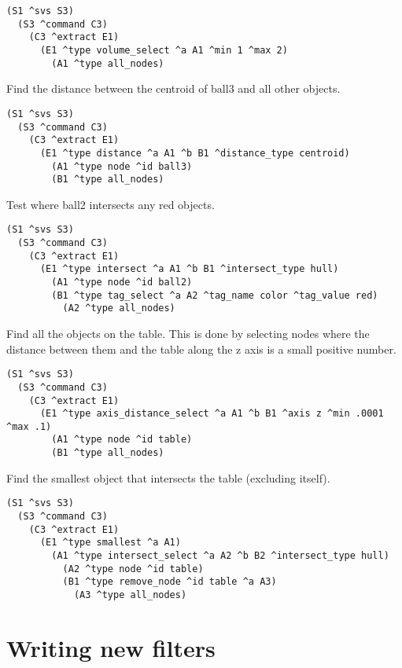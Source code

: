 \begin{verbatim}
(S1 ^svs S3)
  (S3 ^command C3)
    (C3 ^extract E1)
      (E1 ^type volume_select ^a A1 ^min 1 ^max 2)
        (A1 ^type all_nodes)
\end{verbatim} 

Find the distance between the centroid of ball3 and all other objects. 

\begin{verbatim}
(S1 ^svs S3)
  (S3 ^command C3)
    (C3 ^extract E1)
      (E1 ^type distance ^a A1 ^b B1 ^distance_type centroid)
        (A1 ^type node ^id ball3)
        (B1 ^type all_nodes)
\end{verbatim} 

Test where ball2 intersects any red objects. 

\begin{verbatim}
(S1 ^svs S3)
  (S3 ^command C3)
    (C3 ^extract E1)
      (E1 ^type intersect ^a A1 ^b B1 ^intersect_type hull)
        (A1 ^type node ^id ball2)
        (B1 ^type tag_select ^a A2 ^tag_name color ^tag_value red)
          (A2 ^type all_nodes)
\end{verbatim}

Find all the objects on the table. This is done by selecting nodes 
where the distance between them and the table along the z axis is a small positive number. 

\begin{verbatim}
(S1 ^svs S3)
  (S3 ^command C3)
    (C3 ^extract E1)
      (E1 ^type axis_distance_select ^a A1 ^b B1 ^axis z ^min .0001 ^max .1)
        (A1 ^type node ^id table)
        (B1 ^type all_nodes)
\end{verbatim}

Find the smallest object that intersects the table (excluding itself). 

\begin{verbatim}
(S1 ^svs S3)
  (S3 ^command C3)
    (C3 ^extract E1)
      (E1 ^type smallest ^a A1)
        (A1 ^type intersect_select ^a A2 ^b B2 ^intersect_type hull)
          (A2 ^type node ^id table)
          (B1 ^type remove_node ^id table ^a A3)
            (A3 ^type all_nodes)
\end{verbatim}


\section{Writing new filters}

